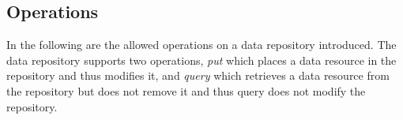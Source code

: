 \subsection{Operations}
In the following are the allowed operations on a data repository introduced. The data repository supports two operations, \emph{put} which places a data resource in the repository and thus modifies it, and \emph{query} which retrieves a data resource from the repository but does not remove it and thus query does not modify the repository.

